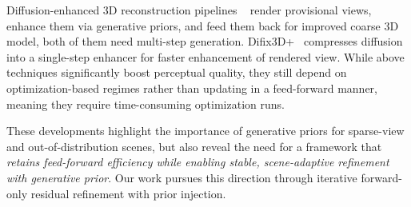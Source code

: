 Diffusion-enhanced 3D reconstruction pipelines ~\cite{yu2024viewcrafter, wu2025genfusion,liu20243dgs,fischer2025flowr} render provisional views, enhance them via generative priors, and feed them back for improved coarse 3D model, both of them need multi-step generation. Difix3D+~\cite{wu2025difix3d+} compresses diffusion into a single-step enhancer for faster enhancement of rendered view. While above techniques significantly boost perceptual quality, they still depend on optimization-based regimes rather than updating in a feed-forward manner, meaning they require time-consuming optimization runs.

These developments highlight the importance of generative priors for sparse-view and out-of-distribution scenes, but also reveal the need for a framework that \emph{retains feed-forward efficiency while enabling stable, scene-adaptive refinement with generative prior}. Our work pursues this direction through iterative forward-only residual refinement with prior injection.

